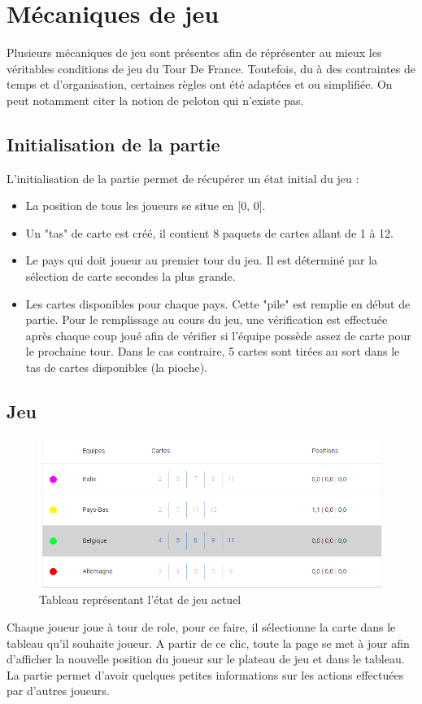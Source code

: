 \documentclass[a4paper, 11pt]{article}
\begin{document}
\newpage

\section{Mécaniques de jeu}
Plusieurs mécaniques de jeu sont présentes afin de réprésenter au mieux les véritables conditions de jeu du Tour De France. Toutefois, du à des contraintes de temps et d'organisation, certaines
règles ont été adaptées et ou simplifiée. On peut notamment citer la notion de peloton qui n'existe pas.

\subsection{Initialisation de la partie}
L'initialisation de la partie permet de récupérer un état initial du jeu :
\begin{itemize}
	\item La position de tous les joueurs se situe en [0, 0].
	\item Un "tas" de carte est créé, il contient 8 paquets de cartes allant de 1 à 12.
	\item Le pays qui doit joueur au premier tour du jeu. Il est déterminé par la sélection de carte secondes la plus grande.
	\item Les cartes disponibles pour chaque pays. Cette "pile" est remplie en début de partie. Pour le remplissage au cours du jeu, une vérification est effectuée après chaque coup joué afin de vérifier si l'équipe possède assez de carte pour le prochaine tour. Dans le cas contraire, 5 cartes sont tirées au sort dans le tas de cartes disponibles (la pioche).
\end{itemize}

\subsection{Jeu}
\begin{figure}[!h]
	\centering
	\includegraphics[scale=.6]{assets/game-state-table}
	\caption{Tableau représentant l'état de jeu actuel}
\end{figure}
Chaque joueur joue à tour de role, pour ce faire, il sélectionne la carte dans le tableau qu'il souhaite joueur.
A partir de ce clic, toute la page se met à jour afin d'afficher la nouvelle position du joueur sur le plateau de jeu et dans le tableau.
La partie  permet d'avoir quelques petites informations sur les actions effectuées par d'autres joueurs.
\end{document}
